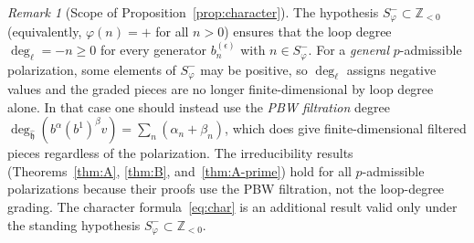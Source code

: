 \documentclass{amsart}
\newcommand{\Z}{\mathbb{Z}}
\newcommand{\h}{\mathfrak{h}}
\newcommand{\wh}[1]{\widehat{#1}}
\newcommand{\whh}{\wh{\h}}
\theoremstyle{definition}
\theoremstyle{remark}
\newtheorem{remark}[theorem]{Remark}
\numberwithin{equation}{section}
\begin{document}
\begin{remark}[Scope of Proposition~\ref{prop:character}]\label{rem:char-scope}
The hypothesis $S_\varphi^-\subset\Z_{<0}$ (equivalently, $\varphi(n)=+$
for all $n>0$) ensures that the loop degree $\deg_\ell = -n \ge 0$ for
every generator $b_n^{(\epsilon)}$ with $n\in S_\varphi^-$.  For a
\emph{general} $p$-admissible polarization, some elements of
$S_\varphi^-$ may be positive, so $\deg_\ell$ assigns negative values
and the graded pieces are no longer finite-dimensional by loop degree
alone.  In that case one should instead use the \emph{PBW filtration}
degree $\deg_{\whh}(b^\alpha(b^1)^\beta v)=\sum_n(\alpha_n+\beta_n)$,
which does give finite-dimensional filtered pieces regardless of the
polarization.  The irreducibility results (Theorems~\ref{thm:A},
\ref{thm:B}, and~\ref{thm:A-prime}) hold for all $p$-admissible
polarizations because their proofs use the PBW filtration, not the
loop-degree grading.  The character formula~\eqref{eq:char} is an
additional result valid only under the standing hypothesis
$S_\varphi^-\subset\Z_{<0}$.
\end{remark}
\end{document}
